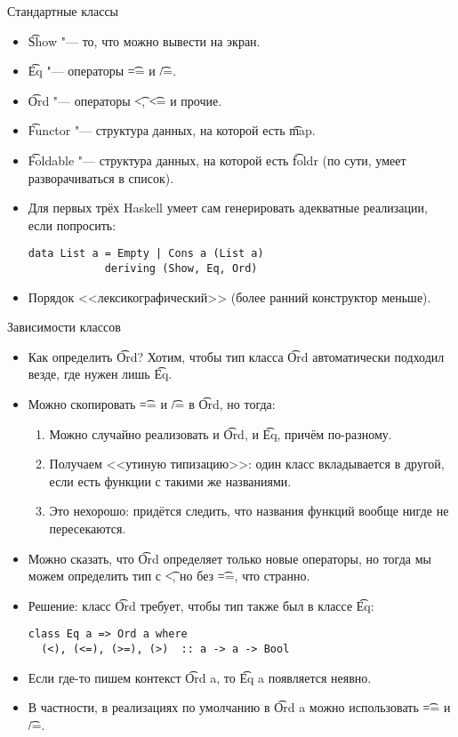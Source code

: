 \begin{frame}[fragile]{Стандартные классы}
	\begin{itemize}
		\item \t{Show} "--- то, что можно вывести на экран.
		\item \t{Eq} "--- операторы \t{==} и \t{/=}.
		\item \t{Ord} "--- операторы \t{<}, \t{<=} и прочие.
		\item \t{Functor} "--- структура данных, на которой есть \t{map}.
		\item \t{Foldable} "--- структура данных, на которой есть \t{foldr} (по сути, умеет разворачиваться в список).
		\item Для первых трёх Haskell умеет сам генерировать адекватные реализации, если попросить:
\begin{verbatim}
data List a = Empty | Cons a (List a)
            deriving (Show, Eq, Ord)
\end{verbatim}
		\item Порядок <<лексикографический>> (более ранний конструктор меньше).
	\end{itemize}
\end{frame}

\begin{frame}[fragile]{Зависимости классов}
	\begin{itemize}
		\item Как определить \t{Ord}? Хотим, чтобы тип класса \t{Ord} автоматически подходил везде, где нужен лишь \t{Eq}.
		\item Можно скопировать \t{==} и \t{/=} в \t{Ord}, но тогда:
			\begin{enumerate}
				\item Можно случайно реализовать и \t{Ord}, и \t{Eq}, причём по-разному.
				\item Получаем <<утиную типизацию>>: один класс вкладывается в другой, если есть функции с такими же названиями.
				\item Это нехорошо: придётся следить, что названия функций вообще нигде не пересекаются.
			\end{enumerate}
		\item Можно сказать, что \t{Ord} определяет только новые операторы, но тогда мы можем определить тип с \t{<}, но без \t{==}, что странно.
		\item Решение: класс \t{Ord} требует, чтобы тип также был в классе \t{Eq}:
\begin{verbatim}
class Eq a => Ord a where
  (<), (<=), (>=), (>)  :: a -> a -> Bool
\end{verbatim}
		\item Если где-то пишем контекст \t{Ord a}, то \t{Eq a} появляется неявно.
		\item В частности, в реализациях по умолчанию в \t{Ord a} можно использовать \t{==} и \t{/=}.
	\end{itemize}
\end{frame}

